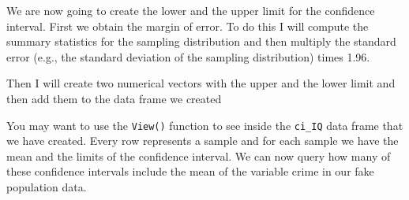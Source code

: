 \documentclass[
]{book}
\newenvironment{Shaded}{\begin{snugshade}}{\end{snugshade}}
\newcommand{\AttributeTok}[1]{\textcolor[rgb]{0.77,0.63,0.00}{#1}}
\newcommand{\CommentTok}[1]{\textcolor[rgb]{0.56,0.35,0.01}{\textit{#1}}}
\newcommand{\FloatTok}[1]{\textcolor[rgb]{0.00,0.00,0.81}{#1}}
\newcommand{\FunctionTok}[1]{\textcolor[rgb]{0.00,0.00,0.00}{#1}}
\newcommand{\NormalTok}[1]{#1}
\newcommand{\OtherTok}[1]{\textcolor[rgb]{0.56,0.35,0.01}{#1}}
\newcommand{\SpecialCharTok}[1]{\textcolor[rgb]{0.00,0.00,0.00}{#1}}
\begin{document}
We are now going to create the lower and the upper limit for the confidence interval. First we obtain the margin of error. To do this I will compute the summary statistics for the sampling distribution and then multiply the standard error (e.g., the standard deviation of the sampling distribution) times 1.96.

\begin{Shaded}
\end{Shaded}

Then I will create two numerical vectors with the upper and the lower limit and then add them to the data frame we created

\begin{Shaded}
\end{Shaded}

You may want to use the \texttt{View()} function to see inside the \texttt{ci\_IQ} data frame that we have created. Every row represents a sample and for each sample we have the mean and the limits of the confidence interval. We can now query how many of these confidence intervals include the mean of the variable crime in our fake population data.

\begin{Shaded}
\end{Shaded}
\end{document}
